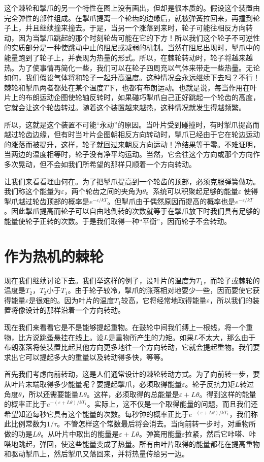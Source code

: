 这个棘轮和掣爪的另一个特性在图上没有画出，但却是很本质的。假设这个装置由完全弹性的部件组成。在掣爪提离一个轮齿的边缘后，就被弹簧拉回来，再撞到轮子上，并且继续撞来撞去。于是，当另一个涨落到来时，轮子可能往相反方向转动，因为当掣爪跳起的那个时刻轮齿可能在它的下方！所以我们这个轮子不可逆性的实质部分是一种使跳动中止的阻尼或减弱的机制。当然在阻尼出现时，掣爪中的能量跑到了轮子上，并表现为热量的形式。所以，在棘轮转动时，轮子将越来越热。为了使事情再简化一些，我们可以在轮子四周充以气体来带走一些热量。无论如何，我们假设气体将和轮子一起升高温度。这种情况会永远继续下去吗？不行！棘轮和掣爪两者都处在某个温度$T$下，也都有布朗运动。也就是说，每当作用在叶片上的布朗运动企图使轮轴反转时，如果碰巧掣爪自己正好跳起一个轮齿的高度，它就会让这个轮齿转过。随着这个装置越来越热，这种情况就发生得越频繁。

所以，这就是这个装置不可能“永动”的原因。当叶片受到碰撞时，有时掣爪提高而越过轮齿边缘，但有时当叶片企图朝相反方向转动时，掣爪已经由于它在轮边运动的涨落而被提升，这样，轮子就回过来朝反方向运动！净结果等于零。不难证明，当两边的温度相等时，轮子没有净平均运动。当然，它会往这个方向或那个方向作多次晃动，但不会如我们所希望的那样只顺着一个方向转动。

让我们来看看理由何在。为了把掣爪提高到一个轮齿的顶部，必须克服弹簧做功。我们称这个能量为$\varepsilon$，两个轮齿之间的夹角为$\theta$。系统可以积聚起足够的能量$\varepsilon$ 使得掣爪越过轮齿顶部的概率是$e^{-\varepsilon / kT}$。但掣爪由于偶然原因而提高的概率也是$e^{-\varepsilon / kT}$。因此掣爪提高而轮子可以自由地倒转的次数就等于在掣爪放下时我们具有足够的能量使轮子正转的次数。于是我们取得一种“平衡”，因而轮子不会转动。

\section{作为热机的棘轮}

现在我们继续讨论下去。我们举这样的例子，设叶片的温度为$T_1$，而轮子或棘轮的温度是$T_2$，$T_2$小于$T_1$。由于轮子较冷，掣爪的涨落相对地要少一些，因而要使它获得能量$\varepsilon$是很难的。因为叶片的温度$T_1$较高，它将经常地取得能量$\varepsilon$，所以我们的装置将像设计的那样沿着一个方向转动。

现在我们来看看它是不是能够提起重物。在鼓轮中间我们缚上一根线，将一个重物，比方说跳蚤悬挂在线上。设$L$是重物所产生的力矩。如果$L$不太大，那么由于布朗涨落将使装置比起其他方向更多地往一个方向转动，它就会提起重物。我们要求出它可以提起多大的重量以及转动得多快，等等。

首先我们考虑向前转动，这是人们通常设计的棘轮转动方式。为了向前转一步，要从叶片末端取得多少能量呢？要提起掣爪，必须取得能量$\varepsilon$。轮子反抗力矩$L$转过角度$\theta$，所以还需要能量$L\theta$。这样，必须取得的总能量是$\varepsilon +L\theta$。得到这样的能量的概率正比于$e^{-(\varepsilon+L\theta) / kT_1}$。实际上，这不仅是一个取得能量的问题，而且我们还希望知道每秒它具有这个能量的次数。每秒钟的概率正比于$e^{-(\varepsilon+L\theta) / kT_1}$，我们称此比例常数为$1/\tau$。不管怎样这个常数最后将会消去。当向前转一步时，对重物所做的功是$L\theta$。从叶片中取出的能量是$\varepsilon +L\theta$。弹簧用能量$\varepsilon$拉紧，然后它咔嗒、咔嗒地跳起，弹回，使这些能量变成了热量。所有由叶片取得的能量都花在提高重物和驱动掣爪上，然后掣爪又落回来，并将热量传给另一边。

